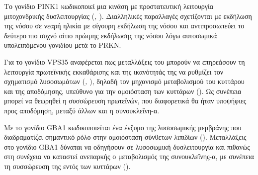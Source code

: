 \documentclass[12pt]{report}
\begin{document}
        \par
        Το γονίδιο PINK1 κωδικοποιεί μια κινάση με προστατευτική λειτουργία μιτοχονδρικής δυσλειτουργίας (\emph{\cite{Trevisan2024GeneticsPerspectives}, \cite{Lucking2000Gene}}). Διαλληλικές παραλλαγές σχετίζονται με εκδήλωση της νόσου σε νεαρή ηλικία με σίγουρη εκδήλωση της νόσου και αντιπροσωπεύει το δεύτερο πιο συχνό αίτιο πρώιμης εκδήλωσης της νόσου λόγω αυτοσωμικά υπολειπόμενου γονιδίου μετά το PRKN.
        
        \par
        Για το γονίδιο VPS35 αναφέρεται πως μεταλλάξεις του μπορούν να επηρεάσουν τη λειτουργία πρωτεϊνικής εκκαθάρισης και της ικανότητάς της να ρυθμίζει τον σχηματισμό λυσοσωμάτων (\emph{\cite{Trevisan2024GeneticsPerspectives}, \cite{Sassone2021TheDisease}}), δηλαδή τον μηχανισμό μεταβολισμού του κυττάρου και της αποδόμησης, υπεύθυνο για την ομοιόσταση των κυττάρων (\emph{\cite{Yang2021LysosomeFunctions}}). Ως συνέπεια μπορεί να θεωρηθεί η συσσώρευση πρωτεϊνών, που διαφορετικά θα ήταν υποψήφιες προς αποδόμηση, μεταξύ άλλων και η συνουκλεΐνη-α. 
        \par
        Με το γονίδιο GBA1 κωδικοποιείται ένα ένζυμο της λυσοσωμικής μεμβράνης που διαδραματίζει σημαντικό ρόλο στην ομοιόσταση σύνθετων λιπιδίων (\emph{\cite{Trevisan2024GeneticsPerspectives}}). Μεταλλάξεις στο γονίδιο GBA1 δύναται να οδηγήσουν σε λυσοσωμική δυσλειτουργία και πιθανώς στη συνέχεια να καταστεί ανεπαρκής ο μεταβολισμός της συνουκλεΐνης-α, με συνέπεια τη συσσώρευση της εντός των κυττάρων (\emph{\cite{Smith2022GBATreatments}}).         
        
\end{document}
